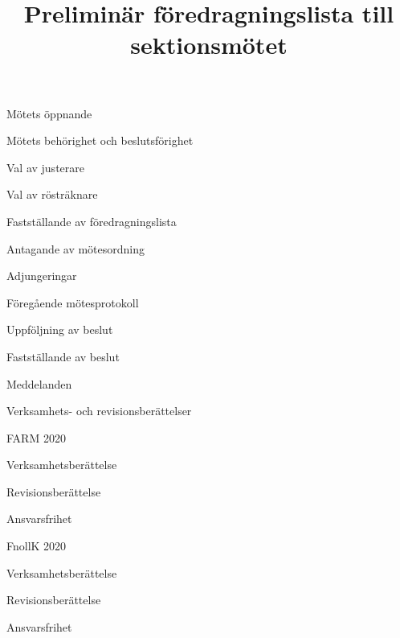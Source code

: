 \documentclass{sektionsmote}
\title{Preliminär föredragningslista till sektionsmötet}
\begin{document}
\maketitle

\begin{ootd}

\item{Mötets öppnande}

\item{Mötets behörighet och beslutsförighet}

\item{Val av justerare}

\item{Val av rösträknare}

\item{Fastställande av föredragningslista}

\item{Antagande av mötesordning}

\item{Adjungeringar}

\item{Föregående mötesprotokoll}

\item{Uppföljning av beslut}

\item{Fastställande av beslut}

\item{Meddelanden}

\item{Verksamhets- och revisionsberättelser}
\begin{ootd}
    \item FARM 2020
    \begin{ootd}
        \item Verksamhetsberättelse
        \item Revisionsberättelse
        \item Ansvarsfrihet
    \end{ootd}
    \item FnollK 2020
    \begin{ootd}
        \item Verksamhetsberättelse
        \item Revisionsberättelse
        \item Ansvarsfrihet
    \end{ootd}
\end{ootd}


\end{ootd}
\end{document}
